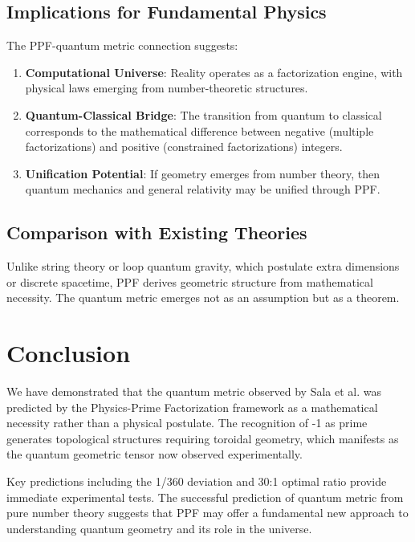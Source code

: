 \documentclass[conference]{IEEEtran}
\begin{document}
\subsection{Implications for Fundamental Physics}

The PPF-quantum metric connection suggests:

\begin{enumerate}
\item \textbf{Computational Universe}: Reality operates as a factorization engine, with physical laws emerging from number-theoretic structures.

\item \textbf{Quantum-Classical Bridge}: The transition from quantum to classical corresponds to the mathematical difference between negative (multiple factorizations) and positive (constrained factorizations) integers.

\item \textbf{Unification Potential}: If geometry emerges from number theory, then quantum mechanics and general relativity may be unified through PPF.
\end{enumerate}

\subsection{Comparison with Existing Theories}

Unlike string theory or loop quantum gravity, which postulate extra dimensions or discrete spacetime, PPF derives geometric structure from mathematical necessity. The quantum metric emerges not as an assumption but as a theorem.

\section{Conclusion}

We have demonstrated that the quantum metric observed by Sala et al. was predicted by the Physics-Prime Factorization framework as a mathematical necessity rather than a physical postulate. The recognition of -1 as prime generates topological structures requiring toroidal geometry, which manifests as the quantum geometric tensor now observed experimentally.

Key predictions including the 1/360 deviation and 30:1 optimal ratio provide immediate experimental tests. The successful prediction of quantum metric from pure number theory suggests that PPF may offer a fundamental new approach to understanding quantum geometry and its role in the universe.
\end{document}
